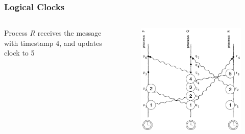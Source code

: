 \documentclass{beamer}
\begin{document}
\frame
{
	\frametitle{Logical Clocks}

	\begin{columns}
	\begin{column}{0.6\textwidth}

		Process $R$ receives the message with timestamp 4, and updates clock to 5


	\end{column}
	\begin{column}{0.4\textwidth}

		\begin{figure}[ht!]
		\includegraphics[width=\textwidth]{files/ClockDist-Impl-Logical-Clock-4.png}
		\end{figure}


	\end{column}
	\end{columns}


}
\end{document}
